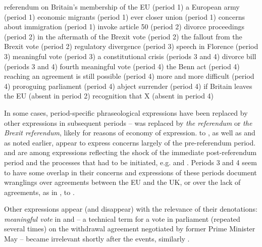 \documentclass[output=paper]{langscibook}
\begin{document}
\ea referendum on Britain’s membership of the EU (period 1)\label{ex:buerki:56}
\ex a European army (period 1)\label{ex:buerki:57}
\ex economic migrants (period 1)\label{ex:buerki:58}
\ex ever closer union (period 1)\label{ex:buerki:59}
\ex concerns about immigration (period 1)\label{ex:buerki:60}
\ex invoke article 50 (period 2)\label{ex:buerki:61}
\ex divorce proceedings (period 2)\label{ex:buerki:62}
\ex in the aftermath of the Brexit vote (period 2)\label{ex:buerki:63}
\ex the fallout from the Brexit vote (period 2)\label{ex:buerki:64}
\ex regulatory divergence (period 3)\label{ex:buerki:65}
\ex speech in Florence (period 3)\label{ex:buerki:66}
\ex\relax [a/the][second] meaningful vote (period 3)\label{ex:buerki:67}
\ex a constitutional crisis (periods 3 and 4)\label{ex:buerki:68}
\ex\relax [Brexit] divorce bill (periods 3 and 4)\label{ex:buerki:69}
\ex fourth meaningful vote (period 4)\label{ex:buerki:70}
\ex the Benn act (period 4)\label{ex:buerki:71}
\ex reaching an agreement is still possible (period 4)\label{ex:buerki:72}
\ex more and more difficult (period 4)\label{ex:buerki:73}
\ex proroguing parliament (period 4)\label{ex:buerki:74}
\ex abject surrender (period 4)\label{ex:buerki:75}
\ex if Britain leaves the EU (absent in period 2)\label{ex:buerki:76}
\ex recognition that X (absent in period 4)\label{ex:buerki:77}
\z

In some cases, period-specific phraseological expressions have been replaced by other expressions in subsequent periods --  was replaced by \textit{the referendum} or \textit{the Brexit referendum}, likely for reasons of economy of expression.  to , as well as  and  as noted earlier, appear to express concerns largely of the pre-referendum period.  and  are among expressions reflecting the shock of the immediate post-referendum period and the processes that had to be initiated, e.g.  and . Periods 3 and 4 seem to have some overlap in their concerns and expressions of these periods document wranglings over agreements between the EU and the UK, or over the lack of agreements, as in ,  to .

Other expressions appear (and disappear) with the relevance of their denotations: \textit{meaningful vote} in  and  -- a technical term for a vote in parliament (repeated several times) on the withdrawal agreement negotiated by former Prime Minister May -- became irrelevant shortly after the events, similarly .
\end{document}
